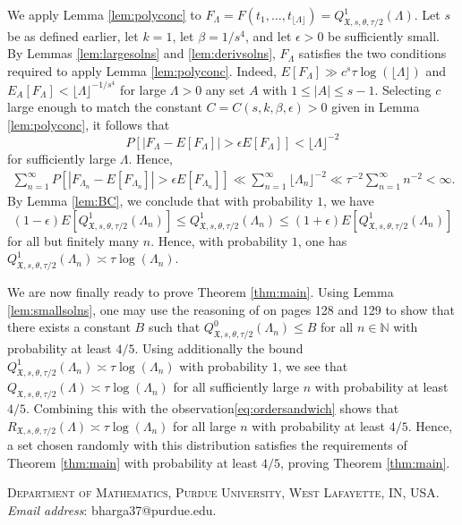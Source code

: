 \documentclass[11pt,reqno]{amsart}
\numberwithin{equation}{section}
\begin{document}
We apply Lemma \ref{lem:polyconc} to $F_{\Lambda} = F(t_1,\ldots,t_{\lfloor \Lambda \rfloor} ) = Q^1_{\mathfrak{X},s,\theta,\tau/2}(\Lambda)$. Let $s$ be as defined earlier, let $k = 1$, let $\beta = 1/s^4$, and let $\epsilon > 0$ be sufficiently small. 
By Lemmas \ref{lem:largesolns} and \ref{lem:derivsolns}, $F_{\Lambda}$ satisfies the two conditions required to apply Lemma \ref{lem:polyconc}. Indeed, $E[F_{\Lambda} ] \gg c^s\tau\log(\lfloor \Lambda \rfloor) $ and $E_A[F_{\Lambda} ] < \lfloor \Lambda \rfloor^{-1/s^4} $ for large $\Lambda >0$ any set $A$ with $1 \leq |A| \leq s-1$. Selecting $c$ large enough to match the constant $C = C(s,k,\beta,\epsilon) > 0$ given in Lemma \ref{lem:polyconc}, it follows that 
\[ P[|F_{\Lambda}-E[F_{\Lambda}]| > \epsilon E[F_{\Lambda}]]
< \lfloor \Lambda \rfloor^{-2} \]
for sufficiently large $\Lambda$. Hence, 
\begin{align*} \sum_{n=1}^{\infty} P[|F_{\Lambda_n}-E[F_{\Lambda_n}]| > \epsilon E[F_{\Lambda_n}]]  \ll \sum_{n=1}^{\infty} \lfloor \Lambda_n \rfloor^{-2} \ll \tau^{-2} \sum_{n=1}^{\infty} n^{-2} < \infty. 
\end{align*}
By Lemma \ref{lem:BC}, we conclude that with probability $1$, we have 
\[ (1-\epsilon)E[Q^1_{\mathfrak{X},s,\theta,\tau/2}(\Lambda_n)] \leq Q^1_{\mathfrak{X},s,\theta,\tau/2}(\Lambda_n) \leq (1+\epsilon)E[Q^1_{\mathfrak{X},s,\theta,\tau/2}(\Lambda_n)] \]
for all but finitely many $n$. Hence, with probability $1$, one has $Q^1_{\mathfrak{X},s,\theta,\tau/2}(\Lambda_n) \asymp \tau \log(\Lambda_n)$.

We are now finally ready to prove Theorem \ref{thm:main}. Using Lemma \ref{lem:smallsolns}, one may use the reasoning of \cite{VuRef} on pages 128 and 129 to show that there exists a constant $B$ such that $Q^0_{\mathfrak{X},s,\theta,\tau/2}(\Lambda_n) \leq B$ for all $n \in \mathbb{N}$ with probability at least $4/5$. Using additionally the bound $Q^1_{\mathfrak{X},s,\theta,\tau/2}(\Lambda_n) \asymp \tau \log(\Lambda_n)$ with probability $1$, we see that $Q_{\mathfrak{X},s,\theta, \tau/2}(\Lambda) \asymp \tau\log(\Lambda_n) $ for all sufficiently large $n$ with probability at least $4/5$. Combining this with the observation\eqref{eq:ordersandwich} shows that $R_{\mathfrak{X},s,\theta, \tau/2}(\Lambda) \asymp \tau\log(\Lambda_n) $ for all large $n$ with probability at least $4/5$. Hence, a set chosen randomly with this distribution satisfies the requirements of Theorem \ref{thm:main} with probability at least $4/5$, proving Theorem \ref{thm:main}. 






\noindent\textsc{Department of Mathematics, Purdue University, West Lafayette, IN, USA.}
\vspace{.03in}
\newline\noindent\textit{Email address}: bharga37@purdue.edu.
\end{document}
